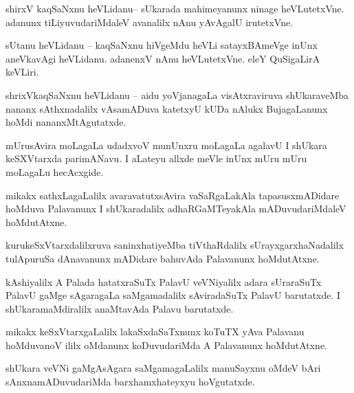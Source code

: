 \documentclass{article}
\begin{document}
\begin{mn}%
shirxV kaqSaNxnu heVLidanu-- sUkarada mahimeyanunx ninage heVLutetxVne. adanunx tiLiyuvudariMdaleV 
avanalilx nAnu yAvAgalU irutetxVne.
\end{mn}

\begin{mn}%
sUtanu heVLidanu -- kaqSaNxnu hiVgeMdu heVLi satayxBAmeVge inUnx aneVkavAgi heVLidanu. adanenxV 
nAnu heVLutetxVne. eleY QuSigaLirA keVLiri.
\end{mn}

\begin{mn}%
shrixVkaqSaNxnu heVLidanu -- aidu yoVjanagaLa visAtxraviruva shUkaraveMba nananx sAthxnadalilx 
vAsamADuva katetxyU kUDa nAlukx BujagaLanunx hoMdi nananxMtAgutatxde.
\end{mn}

\begin{mn}%
mUrusAvira moLagaLa udadxvoV munUnxru moLagaLa agalavU I shUkara keSXVtarxda parimANavu. I aLateyu 
allxde meVle inUnx mUru mUru moLagaLu hecAcxgide.
\end{mn}

\begin{mn}%
mikakx sathxLagaLalilx avaravatutxsAvira vaSaRgaLakAla tapasusxmADidare hoMduva Palavanunx I 
shUkaradalilx adhaRGaMTeyakAla mADuvudariMdaleV hoMdutAtxne.
\end{mn}

\begin{mn}%
kurukeSxVtarxdalilxruva saninxhatiyeMba tiVthaRdalilx sUrayxgarxhaNadalilx tulApuruSa dAnavanunx 
mADidare bahuvAda Palavanunx hoMdutAtxne.
\end{mn}

\begin{mn}%
kAshiyalilx A Palada hatatxraSuTx PalavU veVNiyalilx adara sUraraSuTx PalavU gaMge sAgaragaLa 
saMgamadalilx sAviradaSuTx PalavU barutatxde. I shUkaramaMdiralilx anaMtavAda Palavu barutatxde.
\end{mn}

\begin{mn}%
mikakx keSxVtarxgaLalilx lakaSxdaSaTxnunx koTuTX yAva Palavanu hoMduvanoV ililx oMdanunx 
koDuvudariMda A Palavanunx hoMdutAtxne. 
\end{mn}

\begin{mn}%
shUkara veVNi gaMgAsAgara saMgamagaLalilx manuSayxnu oMdeV bAri sAnxnamADuvudariMda 
barxhamxhateyxyu hoVgutatxde.
\end{mn}
\end{document}
